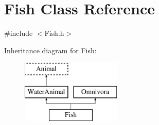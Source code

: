 \hypertarget{classFish}{\section{Fish Class Reference}
\label{classFish}
}


{\ttfamily \#include $<$Fish.\-h$>$}

Inheritance diagram for Fish\-:\begin{figure}[H]
\begin{center}
\leavevmode
\includegraphics[height=3.000000cm]{classFish}
\end{center}
\end{figure}
